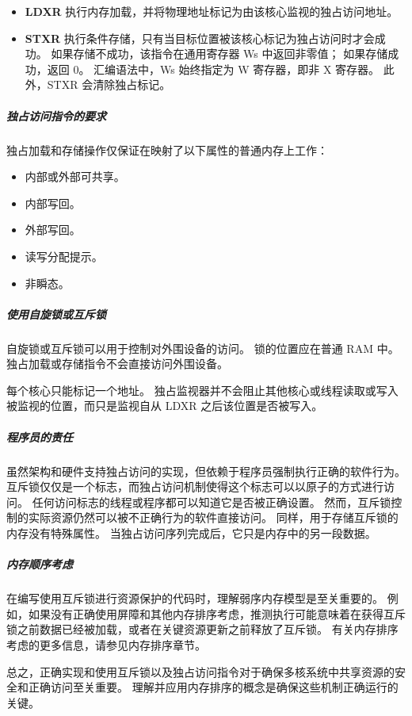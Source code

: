 \begin{itemize}
\item
  \textbf{LDXR}
  执行内存加载，并将物理地址标记为由该核心监视的独占访问地址。
\item
  \textbf{STXR}
  执行条件存储，只有当目标位置被该核心标记为独占访问时才会成功。
  如果存储不成功，该指令在通用寄存器 Ws 中返回非零值；
  如果存储成功，返回 0。
  汇编语法中，Ws 始终指定为 W 寄存器，即非 X 寄存器。
  此外，STXR 会清除独占标记。
\end{itemize}

\subparagraph*{独占访问指令的要求}

独占加载和存储操作仅保证在映射了以下属性的普通内存上工作：

\begin{itemize}
\item
  内部或外部可共享。
\item
  内部写回。
\item
  外部写回。
\item
  读写分配提示。
\item
  非瞬态。
\end{itemize}

\subparagraph*{使用自旋锁或互斥锁}

自旋锁或互斥锁可以用于控制对外围设备的访问。
锁的位置应在普通 RAM 中。
独占加载或存储指令不会直接访问外围设备。

每个核心只能标记一个地址。
独占监视器并不会阻止其他核心或线程读取或写入被监视的位置，而只是监视自从 LDXR 之后该位置是否被写入。

\subparagraph*{程序员的责任}

虽然架构和硬件支持独占访问的实现，但依赖于程序员强制执行正确的软件行为。
互斥锁仅仅是一个标志，而独占访问机制使得这个标志可以以原子的方式进行访问。
任何访问标志的线程或程序都可以知道它是否被正确设置。
然而，互斥锁控制的实际资源仍然可以被不正确行为的软件直接访问。
同样，用于存储互斥锁的内存没有特殊属性。
当独占访问序列完成后，它只是内存中的另一段数据。

\subparagraph*{内存顺序考虑}

在编写使用互斥锁进行资源保护的代码时，理解弱序内存模型是至关重要的。
例如，如果没有正确使用屏障和其他内存排序考虑，推测执行可能意味着在获得互斥锁之前数据已经被加载，或者在关键资源更新之前释放了互斥锁。
有关内存排序考虑的更多信息，请参见内存排序章节。

总之，正确实现和使用互斥锁以及独占访问指令对于确保多核系统中共享资源的安全和正确访问至关重要。
理解并应用内存排序的概念是确保这些机制正确运行的关键。

